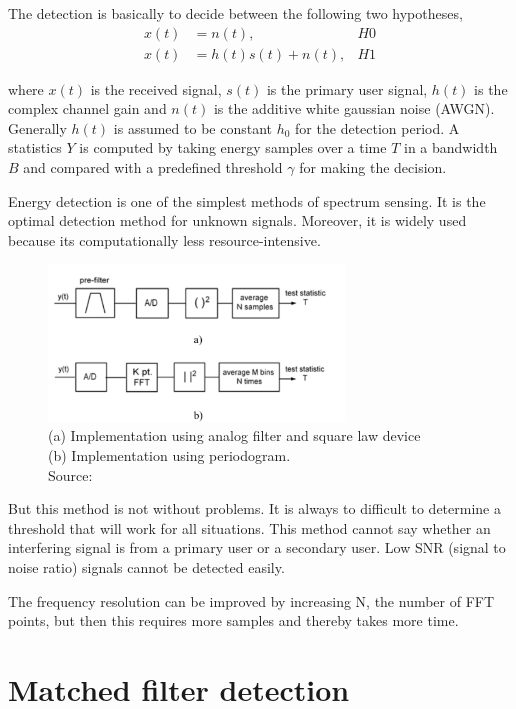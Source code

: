 The detection is basically to decide between the following two hypotheses,
\begin{align}
    x(t) &= n(t), & H0 \nonumber \\
    x(t) &= h(t)s(t) + n(t), & H1 \nonumber
\end{align}

where $x(t)$ is the received signal, $s(t)$ is the primary user signal, $h(t)$
is the complex channel gain and $n(t)$ is the additive white gaussian noise
(AWGN). Generally $h(t)$ is assumed to be constant $h_0$ for the detection 
period. A statistics $Y$ is computed by taking energy samples over a time $T$
in a bandwidth $B$ and compared with a predefined threshold $\gamma$ for 
making the decision.

Energy detection is one of the simplest methods of spectrum sensing. It is the 
optimal detection method for unknown signals. Moreover, it is widely used 
because its computationally less resource-intensive.

\begin{figure}
    \centering
    \includegraphics[width=0.7\textwidth]{energyDetection}
    \caption[Energy Detection block diagram]{(a) Implementation using analog 
    filter and square law device \\
    (b) Implementation using periodogram. \\
    \footnotesize{Source: \cite{cabric06}}}
    \label{energyDetection}
\end{figure}

But this method is not without problems. It is always to difficult to 
determine a threshold that will work for all situations. This method cannot
say whether an interfering signal is from a primary user or a secondary user.
Low SNR (signal to noise ratio) signals cannot be detected easily.

The frequency resolution can be improved by increasing N, the number of FFT 
points, but then this requires more samples and thereby takes more time.

\section{Matched filter detection}

